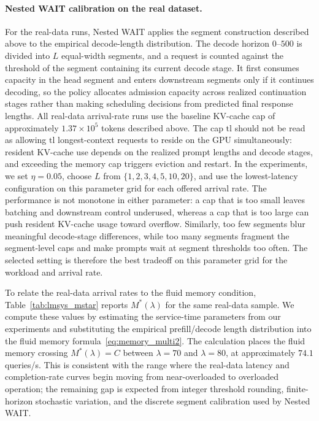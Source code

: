 \paragraph{Nested WAIT calibration on the real dataset.}
For the real-data runs, Nested WAIT applies the segment construction described above to the empirical decode-length distribution. The decode horizon \(0\)--\(500\) is divided into \(L\) equal-width segments, and a request is counted against the threshold of the segment containing its current decode stage. It first consumes capacity in the head segment and enters downstream segments only if it continues decoding, so the policy allocates admission capacity across realized continuation stages rather than making scheduling decisions from predicted final response lengths. All real-data arrival-rate runs use the baseline KV-cache cap of approximately \(1.37\times 10^5\) tokens described above. The cap \(\mathrm{tl}\) should not be read as allowing \(\mathrm{tl}\) longest-context requests to reside on the GPU simultaneously: resident KV-cache use depends on the realized prompt lengths and decode stages, and exceeding the memory cap triggers eviction and restart. In the experiments, we set \(\eta=0.05\), choose \(L\) from \(\{1,2,3,4,5,10,20\}\), and use the lowest-latency configuration on this parameter grid for each offered arrival rate. The performance is not monotone in either parameter: a cap that is too small leaves batching and downstream control underused, whereas a cap that is too large can push resident KV-cache usage toward overflow. Similarly, too few segments blur meaningful decode-stage differences, while too many segments fragment the segment-level caps and make prompts wait at segment thresholds too often. The selected setting is therefore the best tradeoff on this parameter grid for the workload and arrival rate.

To relate the real-data arrival rates to the fluid memory condition, Table~\ref{tab:lmsys_mstar} reports \(M^*(\lambda)\) for the same real-data sample. We compute these values by estimating the service-time parameters from our experiments and substituting the empirical prefill/decode length distribution into the fluid memory formula~\eqref{eq:memory_multi2}. The calculation places the fluid memory crossing \(M^*(\lambda)=C\) between \(\lambda=70\) and \(\lambda=80\), at approximately \(74.1\) queries/s. This is consistent with the range where the real-data latency and completion-rate curves begin moving from near-overloaded to overloaded operation; the remaining gap is expected from integer threshold rounding, finite-horizon stochastic variation, and the discrete segment calibration used by Nested WAIT.

